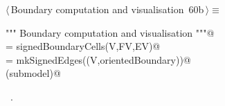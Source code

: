 \documentclass[11pt,oneside]{article}	%
\begin{document}
\begin{flushleft} \small \label{scrap116}
\protect{}$\langle\,$Boundary computation and visualisation\nobreak\ {\footnotesize 60b}$\,\rangle\equiv$
\vspace{-1ex}
\begin{list}{}{} \item
\mbox{}\verb@""" Boundary computation and visualisation """@\\
\mbox{}\verb@orientedBoundary = signedBoundaryCells(V,FV,EV)@\\
\mbox{}\verb@submodel = mkSignedEdges((V,orientedBoundary))@\\
\mbox{}\verb@VIEW(submodel)@\\
\mbox{}\verb@@{\NWsep}
\end{list}
\vspace{-1ex}
\footnotesize\addtolength{\baselineskip}{-1ex}
\begin{list}{}{\setlength{\itemsep}{-\parsep}\setlength{\itemindent}{-\leftmargin}}
\item \NWtxtMacroRefIn\ .
\end{list}
\end{flushleft}
\end{document}
